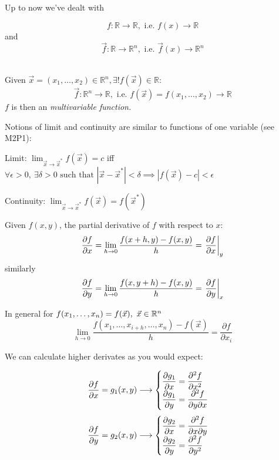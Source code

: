 \documentclass[10pt]{scrartcl}
\begin{document}



\setcounter{lecture}{2}

\pagebreak
{}



Up to now we've dealt with 

\[f: \mathbb{R} \to \mathbb{R}, \text{ i.e. } f(x) \to \mathbb{R}\]
and 
\[\vec{f}: \mathbb{R} \to \mathbb{R}^n, \text{ i.e. } \vec{f}(x) \to \mathbb{R}^n\]~

\begin{definition}
Given $\vec{x} = (x_1,\dots,x_2) \in \mathbb{R}^n, \exists! f(\vec{x}) \in \mathbb{R}$: 
\[\vec{f}: \mathbb{R}^n \to \mathbb{R}, \text{ i.e. } f(\vec{x}) = f(x_1,\dots,x_2) \to \mathbb{R}\]	
$f$ is then an \emph{multivariable function.} 
\end{definition}

\pagebreak


Notions of limit and continuity are similar to functions of one variable (see M2P1):

Limit: $\lim_{{\vec{x}}\to{\vec{x}^*}} f(\vec{x}) = c$ iff $\forall \epsilon >0,~\exists \delta > 0 \text{ such that } |\vec{x} - \vec{x}^*| < \delta \implies |f(\vec{x}) - c| < \epsilon$

Continuity: $\lim_{{\vec{x}}\to{\vec{x}^*}} f(\vec{x}) = f(\vec{x}^*)$\\

\begin{definition}
Given $f(x,y)$, the partial derivative of $f$ with respect to $x$: 
\[\frac{\partial f}{\partial x} = \lim_{h\to0}\frac{f(x+h,y) - f(x,y)}{h} = \left.\frac{\partial f}{\partial x}\right|_y\]
similarly 
\[\frac{\partial f}{\partial y} = \lim_{h\to0}\frac{f(x,y+h) - f(x,y)}{h} = \left.\frac{\partial f}{\partial y}\right|_x\]

In general for $f(x_1,\dots,x_n) = f(\vec{x}),~\vec{x} \in\mathbb{R}^n$
\[\lim_{h\to0}\frac{f(x_1,\dots,x_{i+h},\dots,x_n) - f(\vec{x})}{h} = \frac{\partial f}{\partial x_i}\]
\end{definition}

We can calculate higher derivates as you would expect: 

\[
\begin{aligned}
  \frac{\partial f}{\partial x} &= g_1(x,y) \longrightarrow \begin{cases}
 \dfrac{\partial g_1}{\partial x} = \dfrac{\partial^2f}{\partial x^2}\\[0.1cm]
 \dfrac{\partial g_1}{\partial y} = \dfrac{\partial^2f}{\partial y\partial x}
 \end{cases}\\[0.1cm]
   \dfrac{\partial f}{\partial y} &= g_2(x,y) \longrightarrow \begin{cases}
 \dfrac{\partial g_2}{\partial x} = \dfrac{\partial^2f}{\partial x\partial y}\\[0.1cm]
 \dfrac{\partial g_2}{\partial y} = \dfrac{\partial^2f}{\partial y^2}
 \end{cases}
\end{aligned}\]
\end{document}
